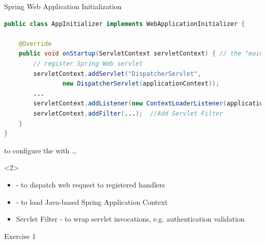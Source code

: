 \begin{frame}[fragile]{Spring Web Application Initialization}
\begin{lstlisting}[language=Java]
public class AppInitializer implements WebApplicationInitializer { 

    @Override
    public void onStartup(ServletContext servletContext) { // the "main" method"
        // register Spring Web servlet
        servletContext.addServlet("DispatcherServlet",
                new DispatcherServlet(applicationContext));	
        ...
        servletContext.addListener(new ContextLoaderListener(applicationContext));		
        servletContext.addFilter(...);  //Add Servlet Filter 
    }
}
\end{lstlisting}
\vfill
{} to configure the  with \ldots
\small
\begin{visibleenv}<2>
\begin{itemize}
\item {} - to dispatch web request to registered handlers
\item {} - to load Java-based Spring Application Context
\item Servlet Filter - to wrap servlet invocations, e.g. authentication validation
\end{itemize}
\end{visibleenv}
\end{frame}


\begin{frame}{Exercise 1}
	\begin{figure}
	\end{figure}
\end{frame}

